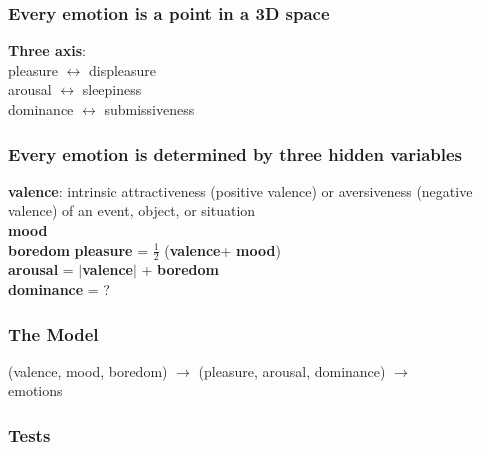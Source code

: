\documentclass{beamer}
\begin{document}
\begin{frame}
\frametitle{Every emotion is a point in a 3D space}

\textbf{Three axis}:\\
pleasure $\leftrightarrow$ displeasure \\
arousal $\leftrightarrow$ sleepiness \\
dominance $\leftrightarrow$ submissiveness

\end{frame}

\begin{frame}
\frametitle{Every emotion is determined by three hidden variables}
\textbf{valence}: intrinsic attractiveness (positive valence) or aversiveness (negative valence) of an event, object, or situation \\
\textbf{mood }\\
\textbf{boredom}
\newline
\newline
\textbf{pleasure} = $\frac{1}{2}$ (\textbf{valence}+ \textbf{mood}) \\
\textbf{arousal} = $|$\textbf{valence}$|$ + \textbf{boredom} \\
\textbf{dominance} = ?

\begin{figure}[h!]
\captionsetup[subfigure]{labelformat=empty}
\centering
{} 
\end{figure}
\end{frame}

\begin{frame}
\frametitle{The Model}
(valence, mood, boredom) $\rightarrow$ 
(pleasure, arousal, dominance) $\rightarrow$ \\
emotions
\end{frame}

\begin{frame}
\frametitle{Tests}
\end{frame}
\end{document}
